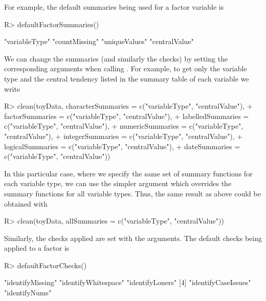 \documentclass[article,shortnames]{jss}
\begin{document}
For example, the default summaries being used for a factor variable is
\begin{Schunk}
\begin{Sinput}
R> defaultFactorSummaries()
\end{Sinput}
\begin{Soutput}
[1] "variableType" "countMissing" "uniqueValues" "centralValue"
\end{Soutput}
\end{Schunk}

We can change the summaries (and similarly the checks) by setting the
corresponding arguments when calling . For example, to get
only the variable type and the central tendency listed in the summary
table of each variable we write

\begin{Schunk}
\begin{Sinput}
R> clean(toyData, characterSummaries = c("variableType", "centralValue"),
+    factorSummaries = c("variableType", "centralValue"),
+    labelledSummaries = c("variableType", "centralValue"),
+    numericSummaries = c("variableType", "centralValue"),
+    integerSummaries = c("variableType", "centralValue"),
+    logicalSummaries = c("variableType", "centralValue"),
+    dateSummaries = c("variableType", "centralValue"))
\end{Sinput}
\end{Schunk}

In this particular case, where we specify the same set of summary
functions for each variable type, we can use the simpler argument
 which overrides the summary functions for all
variable types. Thus, the same result as above could be obtained with

\begin{Schunk}
\begin{Sinput}
R> clean(toyData, allSummaries = c("variableType", "centralValue"))
\end{Sinput}
\end{Schunk}

Similarly, the checks applied are set with the 
arguments. The default checks being applied to a factor is

\begin{Schunk}
\begin{Sinput}
R> defaultFactorChecks()
\end{Sinput}
\begin{Soutput}
[1] "identifyMissing"    "identifyWhitespace" "identifyLoners"    
[4] "identifyCaseIssues" "identifyNums"      
\end{Soutput}
\end{Schunk}
\end{document}
